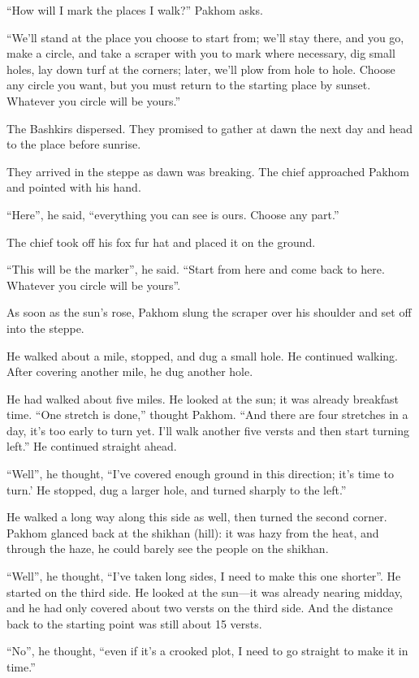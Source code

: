 ``How will I mark the places I walk?'' Pakhom asks.

``We’ll stand at the place you choose to start from; we’ll stay there, and you go, make a circle, and take a scraper with you to mark where necessary, dig small holes, lay down turf at the corners; later, we'll plow from hole to hole. Choose any circle you want, but you must return to the starting place by sunset. Whatever you circle will be yours.''

The Bashkirs dispersed. They promised to gather at dawn the next day and head to the place before sunrise.

They arrived in the steppe as dawn was breaking. The chief approached Pakhom and pointed with his hand.

``Here'', he said, ``everything you can see is ours. Choose any part.''

The chief took off his fox fur hat and placed it on the ground.

``This will be the marker'', he said. ``Start from here and come back to here. Whatever you circle will be yours''.

As soon as the sun's rose, Pakhom slung the scraper over his shoulder and set off into the steppe.

He walked about a mile, stopped, and dug a small hole. He continued walking. After covering another mile, he dug another hole.

He had walked about five miles. He looked at the sun; it was already breakfast time. ``One stretch is done,'' thought Pakhom. ``And there are four stretches in a day, it’s too early to turn yet. I’ll walk another five versts and then start turning left.'' He continued straight ahead. 

``Well'', he thought, ``I’ve covered enough ground in this direction; it’s time to turn.’ He stopped, dug a larger hole, and turned sharply to the left.''

He walked a long way along this side as well, then turned the second corner. Pakhom glanced back at the shikhan (hill): it was hazy from the heat, and through the haze, he could barely see the people on the shikhan. 

``Well'', he thought, ``I've taken long sides, I need to make this one shorter''. He started on the third side. He looked at the sun—it was already nearing midday, and he had only covered about two versts on the third side. And the distance back to the starting point was still about 15 versts. 

``No'', he thought, ``even if it’s a crooked plot, I need to go straight to make it in time.''

